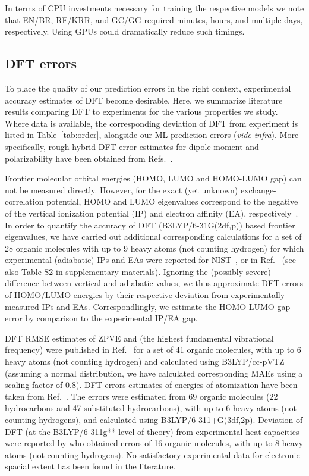 \documentclass[reprint, superscriptaddress,
amsmath,amssymb, aps, prb,
]{revtex4-1}
\begin{document}
{In terms of CPU investments necessary for training the respective models we note that 
EN/BR, RF/KRR, and GC/GG required minutes, hours, and multiple days, respectively. 
Using GPUs could dramatically reduce such timings. 

\subsection{DFT errors}
\label{sec:DFTERR}
To place the quality of our prediction errors in the right context, experimental accuracy estimates of DFT become desirable.
Here, we summarize literature results comparing DFT to experiments for the various properties we study. 
Where data is available, the corresponding deviation of DFT from experiment is listed in Table~\ref{tab:order}, 
alongside our ML prediction errors ({\em vide infra}).
More specifically, rough hybrid DFT error estimates for dipole moment and polarizability have been obtained from Refs.~\cite{ChemistsGuidetoDFT,hickey2014benchmarking}. 


Frontier molecular orbital energies (HOMO, LUMO and HOMO-LUMO gap) can not be measured directly. 
However, for the exact (yet unknown) exchange-correlation potential, HOMO and LUMO eigenvalues correspond
to the negative of the vertical ionization potential (IP) and electron affinity (EA), respectively~\cite{MeaningOfKSorbitals}.
In order to quantify the accuracy of DFT (B3LYP/6-31G(2df,p)) based frontier eigenvalues, we have carried out additional corresponding
calculations for a set of 28 organic molecules with up to 9 heavy atoms (not counting hydrogen) for which experimental
(adiabatic) IPs and EAs were reported for NIST~\cite{nist}, or in Ref.~\cite{parryang} (see also Table S2 in supplementary materials). 
Ignoring the (possibly severe) difference between vertical and adiabatic values, 
we thus approximate DFT errors of HOMO/LUMO energies by their respective deviation from experimentally measured IPs and EAs.
Correspondlingly, we estimate the HOMO-LUMO gap error by comparison to the experimental IP/EA gap. 




DFT RMSE estimates of ZPVE and  (the highest fundamental vibrational frequency) were published in Ref.~\cite{AngelaVibrationDFTerror2004}
for a set of 41 organic molecules, with up to 6 heavy atoms (not counting hydrogen) and calculated using B3LYP/cc-pVTZ 
(assuming a normal distribution, we have calculated corresponding MAEs using a scaling factor of 0.8\cite{Geary1935MAE_RMSE_RATIO}).
DFT errors estimates of energies of atomization have been taken from Ref.~\cite{JhonDFTEnthalpies1997}. 
 The errors were estimated from 69 organic molecules (22 hydrocarbons and 47 substituted hydrocarbons), with up to 6 heavy atoms (not counting hydrogens), and calculated using B3LYP/6-311+G(3df,2p).
Deviation of DFT (at the B3LYP/6-311g** level of theory) from experimental heat capacities were reported by \citet{DeLosCv2007}
who obtained errors of 16 organic molecules, with up to 8 heavy atoms (not counting hydrogens).
No satisfactory experimental data for electronic spacial extent has been found in the literature. 

}
\end{document}
